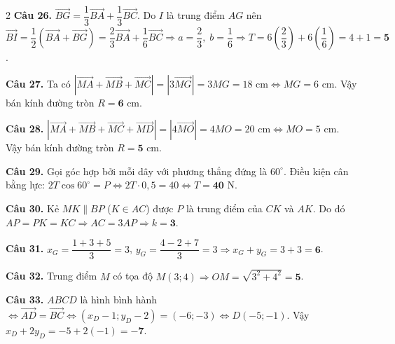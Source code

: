 \documentclass[12pt,a4paper]{article}
\begin{document}
\begin{multicols}{2}
\textbf{Câu 26.} $\vec{BG} = \dfrac{1}{3}\vec{BA} + \dfrac{1}{3}\vec{BC}$. Do $I$ là trung điểm $AG$ nên $\vec{BI} = \dfrac{1}{2}(\vec{BA} + \vec{BG}) = \dfrac{2}{3}\vec{BA} + \dfrac{1}{6}\vec{BC} \Rightarrow a = \dfrac{2}{3},\; b = \dfrac{1}{6} \Rightarrow T = 6\left(\dfrac{2}{3}\right) + 6\left(\dfrac{1}{6}\right) = 4 + 1 = \mathbf{5}$.\par\vspace{2.5pt}

\textbf{Câu 27.} Ta có $|\vec{MA} + \vec{MB} + \vec{MC}| = |3\vec{MG}| = 3MG = 18\text{ cm} \Leftrightarrow MG = 6\text{ cm}$. Vậy bán kính đường tròn $R = \mathbf{6}\text{ cm}$.\par\vspace{2.5pt}

\textbf{Câu 28.} $|\vec{MA} + \vec{MB} + \vec{MC} + \vec{MD}| = |4\vec{MO}| = 4MO = 20\text{ cm} \Leftrightarrow MO = 5\text{ cm}$. Vậy bán kính đường tròn $R = \mathbf{5}\text{ cm}$.\par\vspace{2.5pt}

\textbf{Câu 29.} Gọi góc hợp bởi mỗi dây với phương thẳng đứng là $60^\circ$. Điều kiện cân bằng lực: $2T\cos 60^\circ = P \Leftrightarrow 2T \cdot 0{,}5 = 40 \Leftrightarrow T = \mathbf{40}\text{ N}$.\par\vspace{2.5pt}

\textbf{Câu 30.} Kẻ $MK \parallel BP$ ($K \in AC$) được $P$ là trung điểm của $CK$ và $AK$. Do đó $AP = PK = KC \Rightarrow AC = 3AP \Rightarrow k = \mathbf{3}$.\par\vspace{2.5pt}

\textbf{Câu 31.} $x_G = \dfrac{1 + 3 + 5}{3} = 3$, $y_G = \dfrac{4 - 2 + 7}{3} = 3 \Rightarrow x_G + y_G = 3 + 3 = \mathbf{6}$.\par\vspace{2.5pt}

\textbf{Câu 32.} Trung điểm $M$ có tọa độ $M(3; 4) \Rightarrow OM = \sqrt{3^2 + 4^2} = \mathbf{5}$.\par\vspace{2.5pt}

\textbf{Câu 33.} $ABCD$ là hình bình hành $\Leftrightarrow \vec{AD} = \vec{BC} \Leftrightarrow (x_D - 1; y_D - 2) = (-6; -3) \Leftrightarrow D(-5; -1)$. Vậy $x_D + 2y_D = -5 + 2(-1) = \mathbf{-7}$.\par\vspace{2.5pt}


\end{multicols}
\end{document}
